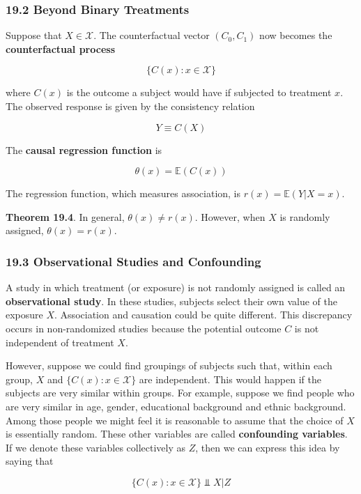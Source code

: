 \subsubsection{19.2 Beyond Binary Treatments}\label{beyond-binary-treatments}

Suppose that \(X \in \mathcal{X}\). The counterfactual vector
\((C_0, C_1)\) now becomes the \textbf{counterfactual process}

\[ \{ C(x) : x \in \mathcal{X} \} \]

where \(C(x)\) is the outcome a subject would have if subjected to
treatment \(x\). The observed response is given by the consistency
relation

\[ Y \equiv C(X) \]

The \textbf{causal regression function} is

\[ \theta(x) = \mathbb{E}(C(x)) \]

The regression function, which measures association, is
\(r(x) = \mathbb{E}(Y | X = x)\).

\textbf{Theorem 19.4}. In general, \(\theta(x) \neq r(x)\). However,
when \(X\) is randomly assigned, \(\theta(x) = r(x)\).

\subsubsection{19.3 Observational Studies and Confounding}\label{observational-studies-and-confounding}

A study in which treatment (or exposure) is not randomly assigned is
called an \textbf{observational study}. In these studies, subjects
select their own value of the exposure \(X\). Association and causation
could be quite different. This discrepancy occurs in non-randomized
studies because the potential outcome \(C\) is not independent of
treatment \(X\).

However, suppose we could find groupings of subjects such that, within
each group, \(X\) and \(\{ C(x) : x \in \mathcal{X} \}\) are
independent. This would happen if the subjects are very similar within
groups. For example, suppose we find people who are very similar in age,
gender, educational background and ethnic background. Among those people
we might feel it is reasonable to assume that the choice of \(X\) is
essentially random. These other variables are called \textbf{confounding
variables}. If we denote these variables collectively as \(Z\), then we
can express this idea by saying that

\[ \{ C(x) : x \in \mathcal{X} \} \text{ ⫫ } X | Z\]

